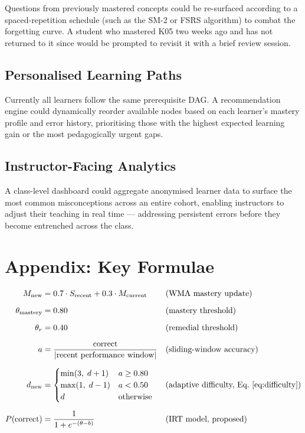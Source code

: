 \documentclass[12pt,a4paper]{article}
\begin{document}
Questions from previously mastered concepts could be re-surfaced according to
a spaced-repetition schedule (such as the SM-2 or FSRS algorithm) to combat
the forgetting curve.  A student who mastered K05 two weeks ago and has not
returned to it since would be prompted to revisit it with a brief review
session.

\subsection{Personalised Learning Paths}

Currently all learners follow the same prerequisite DAG.  A recommendation
engine could dynamically reorder available nodes based on each learner's
mastery profile and error history, prioritising those with the highest
expected learning gain or the most pedagogically urgent gaps.

\subsection{Instructor-Facing Analytics}

A class-level dashboard could aggregate anonymised learner data to surface
the most common misconceptions across an entire cohort, enabling instructors
to adjust their teaching in real time — addressing persistent errors before
they become entrenched across the class.

\section*{Appendix: Key Formulae}

\begin{align}
  M_{\text{new}} &= 0.7 \cdot S_{\text{recent}} + 0.3 \cdot M_{\text{current}}
                  && \text{(WMA mastery update)} \\[6pt]
  \theta_{\text{mastery}} &= 0.80
                  && \text{(mastery threshold)} \\[6pt]
  \theta_{r}     &= 0.40
                  && \text{(remedial threshold)} \\[6pt]
  a              &= \frac{\text{correct}}{|\text{recent performance window}|}
                  && \text{(sliding-window accuracy)} \\[6pt]
  d_{\text{new}} &=
    \begin{cases}
      \min(3,\; d+1) & a \geq 0.80 \\
      \max(1,\; d-1) & a < 0.50 \\
      d              & \text{otherwise}
    \end{cases}
                  && \text{(adaptive difficulty, Eq.~\ref{eq:difficulty})} \\[6pt]
  P(\text{correct}) &= \frac{1}{1 + e^{-(\theta - b)}}
                  && \text{(IRT model, proposed)}
\end{align}
\end{document}
